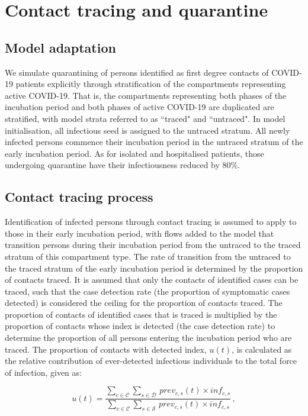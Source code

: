 \section{Contact tracing and quarantine}

\subsection{Model adaptation}
We simulate quarantining of persons identified as first degree contacts of COVID-19 patients explicitly through stratification of the compartments representing active COVID-19.
That is, the compartments representing both phases of the incubation period and both phases of active COVID-19 are duplicated are stratified, with model strata referred to as ``traced" and ``untraced".
In model initialisation, all infectious seed is assigned to the untraced stratum.
All newly infected persons commence their incubation period in the untraced stratum of the early incubation period.
As for isolated and hospitalised patients, those undergoing quarantine have their infectiousness reduced by 80\%.

\subsection{Contact tracing process}
Identification of infected persons through contact tracing is assumed to apply to those in their early incubation period, with flows added to the model that transition persons during their incubation period from the untraced to the traced stratum of this compartment type.
The rate of transition from the untraced to the traced stratum of the early incubation period is determined by the proportion of contacts traced.
It is assumed that only the contacts of identified cases can be traced, such that the case detection rate (the proportion of symptomatic cases detected) is considered the ceiling for the proportion of contacts traced.
The proportion of contacts of identified cases that is traced is multiplied by the proportion of contacts whose index is detected (the case detection rate) to determine the proportion of all persons entering the incubation period who are traced.
The proportion of contacts with detected index, \(u(t)\), is calculated as the relative contribution of ever-detected infectious individuals to the total force of infection, given as:

\[
u(t) = \frac
{\sum_{c \in \mathcal{C}} \sum_{s \in \mathcal{D}} \, prev_{c, s}(t) \times inf_{c, s}}
{\sum_{c \in \mathcal{C}} \sum_{s \in \mathcal{S}} \, prev_{c, s}(t) \times inf_{c, s}} \, ,
\]

